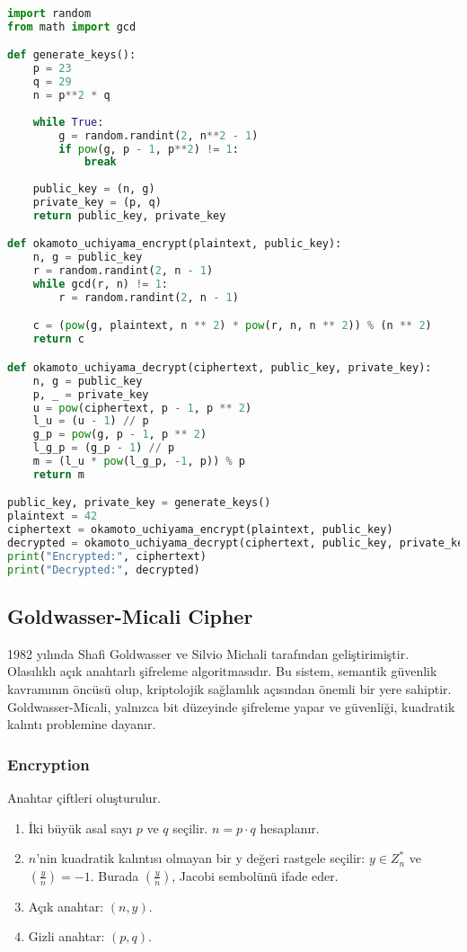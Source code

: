 \begin{lstlisting}[language=Python]
import random
from math import gcd

def generate_keys():
    p = 23
    q = 29
    n = p**2 * q
    
    while True:
        g = random.randint(2, n**2 - 1)
        if pow(g, p - 1, p**2) != 1:
            break
    
    public_key = (n, g)
    private_key = (p, q)
    return public_key, private_key

def okamoto_uchiyama_encrypt(plaintext, public_key):
    n, g = public_key
    r = random.randint(2, n - 1)
    while gcd(r, n) != 1:
        r = random.randint(2, n - 1)

    c = (pow(g, plaintext, n ** 2) * pow(r, n, n ** 2)) % (n ** 2)
    return c

def okamoto_uchiyama_decrypt(ciphertext, public_key, private_key):
    n, g = public_key
    p, _ = private_key
    u = pow(ciphertext, p - 1, p ** 2)
    l_u = (u - 1) // p
    g_p = pow(g, p - 1, p ** 2)
    l_g_p = (g_p - 1) // p
    m = (l_u * pow(l_g_p, -1, p)) % p
    return m

public_key, private_key = generate_keys()
plaintext = 42
ciphertext = okamoto_uchiyama_encrypt(plaintext, public_key)
decrypted = okamoto_uchiyama_decrypt(ciphertext, public_key, private_key)
print("Encrypted:", ciphertext)
print("Decrypted:", decrypted)
\end{lstlisting}

\newpage

\subsection{Goldwasser-Micali Cipher}

1982 yılında Shafi Goldwasser ve Silvio Michali tarafından geliştirimiştir. Olasılıklı açık anahtarlı şifreleme algoritmasıdır. Bu sistem, semantik güvenlik kavramının öncüsü olup, kriptolojik sağlamlık açısından önemli bir yere sahiptir. Goldwasser-Micali, yalnızca bit düzeyinde şifreleme yapar ve güvenliği, kuadratik kalıntı problemine dayanır.

\subsubsection{Encryption}

Anahtar çiftleri oluşturulur.

\begin{enumerate}
    \item İki büyük asal sayı $p$ ve $q$ seçilir. $n = p \cdot q$ hesaplanır.
    \item $n$'nin kuadratik kalıntısı olmayan bir y değeri rastgele seçilir: $y \in Z_{n}^{*}$ ve $(\frac{y}{n}) = -1$. Burada $(\frac{y}{n})$, Jacobi sembolünü ifade eder.
    \item Açık anahtar: $(n, y)$.
    \item Gizli anahtar: $(p, q)$.
\end{enumerate}

